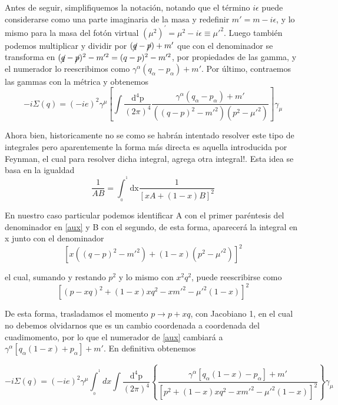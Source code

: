 \documentclass[tickz]{article}
\numberwithin{equation}{section}
\begin{document}
Antes de seguir, simplifiquemos la notación, notando que el término
$i\epsilon$ puede considerarse como una parte imaginaria de la masa
y redefinir $m'=m-i\epsilon$, y lo mismo para la masa del fotón virtual $\left(\mu^{2}\right)^{'}=\mu^{2}-i\epsilon\equiv\mu'^{2}$.
Luego también podemos multiplicar y dividir por $(\cancel{q}-\cancel{p})+m'$
que con el denominador se transforma en $(\cancel{q}-\cancel{p})^{2}-m'^{2}=(q-p)^{2}-m'^{2}$,
por propiedades de las gamma, y el numerador lo reescribimos como
$\gamma^{\alpha}(q_{\alpha}-p_{\alpha})+m'$. Por último, contraemos
las gammas con la métrica y obtenemos
\begin{equation}\label{aux}
-i\Sigma(q)=(-ie)^{2}\gamma^{\mu}\left[\int\frac{\mathrm{\mathrm{d^4}p}}{(2\pi)^{4}}\frac{\gamma^{\alpha}(q_{\alpha}-p_{\alpha})+m'}{\left((q-p)^{2}-m'^{2}\right)\left(p^{2}-\mu'^{2}\right)}\right]\gamma_{\mu}
\end{equation}

Ahora bien, historicamente no se como se habrán intentado resolver
este tipo de integrales pero aparentemente la forma más directa es
aquella introducida por Feynman, el cual para resolver dicha integral,
agrega otra integral!. Esta idea se basa en la igualdad
\begin{equation}\label{integralfeynman2}
\frac{1}{AB}=\int_{_{0}}^{^{1}}\mathrm{dx}\frac{1}{\left[xA+(1-x)B\right]^{2}}
\end{equation}

En nuestro caso particular podemos identificar A con el primer paréntesis
del denominador en \ref{aux} y B con el segundo, de esta forma, aparecerá
la integral en x junto con el denominador
\begin{equation}
\left[x\left((q-p)^{2}-m'^{2}\right)+(1-x)\left(p^{2}-\mu'^{2}\right)\right]^{2}
\end{equation}

el cual, sumando y restando $ p^2 $ y lo mismo con $ x^2q^2 $, puede reescribirse como 
\begin{equation}
\left[\left(p-xq\right)^{2}+(1-x)xq^{2}-xm'^{2}-\mu'^{2}(1-x)\right]^{2}
\end{equation}

De esta forma, trasladamos el momento $p \longrightarrow p + xq$, con Jacobiano
1, en el cual no debemos olvidarnos que es un cambio coordenada a
coordenada del cuadimomento, por lo que el numerador de \ref{aux} cambiará
a $\gamma^{\alpha}\left[q_{\alpha}(1-x)+p_{\alpha}\right]+m'$.
En definitiva obtenemos

\begin{equation}\label{aux1}
-i\Sigma(q)=(-ie)^{2}\gamma^{\mu}\int_{_{0}}^{^{1}}dx\int\frac{\mathrm{\mathrm{d^4}p}}{(2\pi)^{4}}\left\{ \frac{\gamma^{\alpha}\left[q_{\alpha}(1-x)-p_{\alpha}\right]+m'}{\left[p^{2}+(1-x)xq^{2}-xm'^{2}-\mu'^{2}(1-x)\right]^{2}}\right\} \gamma_{\mu}
\end{equation}
\end{document}
